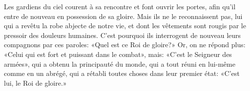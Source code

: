 Les gardiens du ciel courent à sa rencontre et font ouvrir les portes,
	afin qu’il entre de nouveau en possession de sa gloire.
Mais ils ne le reconnaissent pas,
	lui qui a revêtu la robe abjecte de notre vie,
	et dont les vêtements sont rougis par le pressoir des douleurs humaines.
C’est pourquoi ils interrogent de nouveau leurs compagnons par ces paroles:
	«Quel est ce Roi de gloire?»
	Or, on ne répond plus: «Celui qui est fort et puissant dans le combat»,
	mais: «C’est le Seigneur des armées»,
	qui a obtenu la principauté du monde,
	qui a tout réuni en lui-même comme en un abrégé,
	qui a rétabli toutes choses dans leur premier état:
	«C’est lui, le Roi de gloire.»

